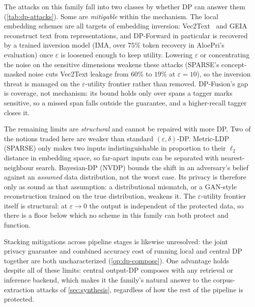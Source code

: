 The attacks on this family fall into two classes by whether DP can answer them
(\cref{tab:dp-attacks}). Some are \emph{mitigable} within the mechanism. The local embedding
schemes are all targets of embedding inversion: Vec2Text~\cite{vec2text} and GEIA~\cite{geia}
reconstruct text from representations, and DP-Forward in particular is recovered by a trained inversion model
(IMA, over $75\%$ token recovery in AloePri's evaluation) once $\varepsilon$ is loosened enough to
keep utility. Lowering $\varepsilon$ or concentrating the noise on the sensitive dimensions weakens
these attacks (SPARSE's concept-masked noise cuts Vec2Text leakage from $60\%$ to $19\%$ at
$\varepsilon{=}10$), so the
inversion threat is managed on the $\varepsilon$-utility frontier rather than removed. DP-Fusion's
gap is coverage, not mechanism: its bound holds only over spans a tagger marks sensitive, so a
missed span falls outside the guarantee, and a higher-recall tagger closes it.

The remaining limits are \emph{structural} and cannot be repaired with more DP. Two of the notions
traded here are weaker than standard $(\varepsilon,\delta)$-DP. Metric-LDP (SPARSE) only makes two
inputs indistinguishable in proportion to their $\ell_2$ distance in embedding space, so far-apart
inputs can be separated with nearest-neighbour search. Bayesian-DP (NVDP)
bounds the shift in an adversary's belief against an \emph{assumed} data distribution, not the worst
case. Its privacy is therefore only as sound as that assumption: a distributional mismatch, or a
GAN-style reconstruction trained on the true distribution, weakens it.
The $\varepsilon$-utility frontier itself is structural: at $\varepsilon\to 0$ the output is
independent of the protected data, so there is a floor below which no scheme in this family can
both protect and function.

Stacking mitigations across pipeline stages is likewise unresolved: the
joint privacy guarantee and combined accuracy cost of running local and central DP together are both
uncharacterized (\cref{op:dp-compose}). One advantage holds despite all of these limits: central
output-DP composes with any retrieval or inference backend, which makes it the family's natural
answer to the corpus-extraction attacks of \cref{sec:synthesis}, regardless of how the rest of the
pipeline is protected.
